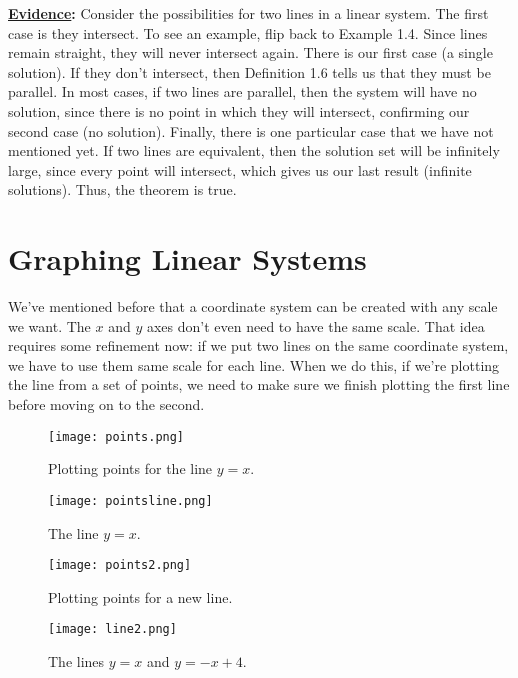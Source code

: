 \noindent
\textbf{\underline{Evidence}:} Consider the possibilities for two lines in a linear system. The first case is they intersect. To see an example, flip back to Example 1.4. Since lines remain straight, they will never intersect again. There is our first case (a single solution). If they don't intersect, then Definition 1.6 tells us that they must be parallel. In most cases, if two lines are parallel, then the system will have no solution, since there is no point in which they will intersect, confirming our second case (no solution). Finally, there is one particular case that we have not mentioned yet. If two lines are equivalent, then the solution set will be infinitely large, since every point will intersect, which gives us our last result (infinite solutions). Thus, the theorem is true. 
\pagebreak

\section{Graphing Linear Systems}

We've mentioned before that a coordinate system can be created with any scale we want.  The $x$ and $y$ axes don't even need to have the same scale.  That idea requires some refinement now: if we put two lines on the same coordinate system, we have to use them same scale for each line.  When we do this, if we're plotting the line from a set of points, we need to make sure we finish plotting the first line before moving on to the second.


\begin{figure}[ht] 
  \label{ fig7} 
  \begin{minipage}[b]{0.5\linewidth}
    \centering
    \texttt{[image: points.png]} 
    \caption{Plotting points for the line $y=x$.} 
    \vspace{4ex}
  \end{minipage}%
  \begin{minipage}[b]{0.5\linewidth}
    \centering
    \texttt{[image: pointsline.png]} 
    \caption{The line $y=x$.} 
    \vspace{4ex}
  \end{minipage} 
  \begin{minipage}[b]{0.5\linewidth}
    \centering
    \texttt{[image: points2.png]} 
    \caption{Plotting points for a new line.} 
    \vspace{4ex}
  \end{minipage}%
  \begin{minipage}[b]{0.5\linewidth}
    \centering
    \texttt{[image: line2.png]} 
    \caption{The lines $y=x$ and $y=-x+4$.} 
    \vspace{4ex}
  \end{minipage} 
\end{figure}


